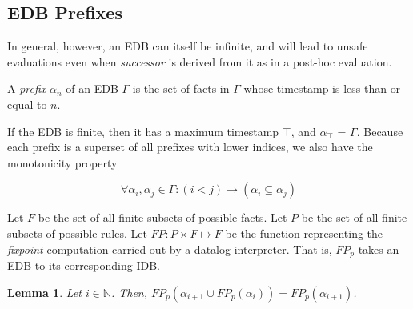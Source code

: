 
\subsection{EDB Prefixes}

In general, however, an EDB can itself be infinite, and will lead to unsafe evaluations even when \emph{successor} is derived from it
as in a post-hoc evaluation.

\begin{definition}
A \emph{prefix} $\alpha_{n}$ of an EDB $\Gamma$ is the set of facts in $\Gamma$ whose timestamp is less than or equal to $n$.
\end{definition}

If the EDB is finite, then it has a maximum timestamp $\top$, and $\alpha_{\top}$ = $\Gamma$.  Because each prefix is a superset of all 
prefixes with lower indices, we also have the monotonicity property

\begin{equation}
\forall \alpha_{i}, \alpha_{j} \in \Gamma : (i < j) \to (\alpha_{i} \subseteq \alpha_{j})
\end{equation}



\begin{definition}
Let $F$ be the set of all finite subsets of possible facts.   
Let $P$ be the set of all finite subsets of possible rules.
Let $FP : P \times F \mapsto F$ be the function representing the
\emph{fixpoint} computation carried out by a datalog interpreter.  That is, $FP_p$ takes an EDB to its corresponding IDB.
\end{definition}

\newtheorem{lemma}{Lemma} 

\begin{lemma}
%
Let $i \in \mathbb{N}$.  Then, $FP_p(\alpha_{i+1} \cup FP_p(\alpha_i)) =
FP_p(\alpha_{i+1})$.
%
\end{lemma}

